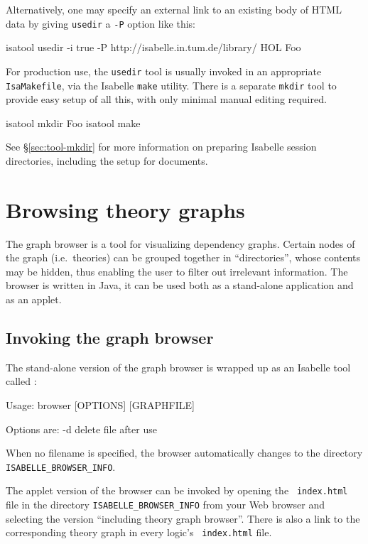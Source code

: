 Alternatively, one may specify an external link to an existing body of HTML
data by giving \texttt{usedir} a \texttt{-P} option like this:
\begin{ttbox}
isatool usedir -i true -P http://isabelle.in.tum.de/library/ HOL Foo
\end{ttbox}

\medskip For production use, the \texttt{usedir} tool is usually invoked in an
appropriate \texttt{IsaMakefile}, via the Isabelle \texttt{make} utility.
There is a separate \texttt{mkdir} tool to provide easy setup of all this,
with only minimal manual editing required.
\begin{ttbox}
isatool mkdir Foo
isatool make
\end{ttbox}
See \S\ref{sec:tool-mkdir} for more information on preparing Isabelle session
directories, including the setup for documents.


\section{Browsing theory graphs} \label{sec:browse}

The graph browser is a tool for visualizing dependency graphs. Certain nodes
of the graph (i.e.~theories) can be grouped together in ``directories'', whose
contents may be hidden, thus enabling the user to filter out irrelevant
information.  The browser is written in Java, it can be used both as a
stand-alone application and as an applet.


\subsection{Invoking the graph browser}

The stand-alone version of the graph browser is wrapped up as an
Isabelle tool called :
\begin{ttbox}
Usage: browser [OPTIONS] [GRAPHFILE]

  Options are:
    -d           delete file after use
\end{ttbox}
When no filename is specified, the browser automatically changes to the
directory \texttt{ISABELLE_BROWSER_INFO}.

\medskip The applet version of the browser can be invoked by opening the {\tt
  index.html} file in the directory \texttt{ISABELLE_BROWSER_INFO} from your
Web browser and selecting the version ``including theory graph browser''.
There is also a link to the corresponding theory graph in every logic's {\tt
  index.html} file.



